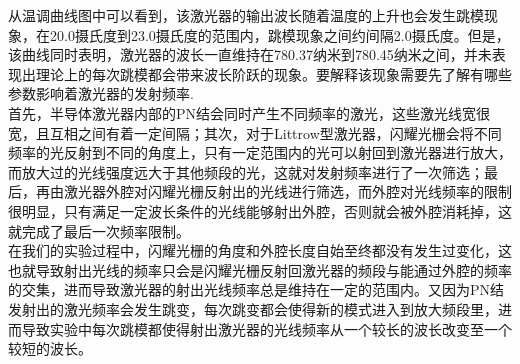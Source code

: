\documentclass{article}
\begin{document}
\begin{CJK}{UTF8}{gkai}
\indent 从温调曲线图中可以看到，该激光器的输出波长随着温度的上升也会发生跳模现象，在20.0摄氏度到23.0摄氏度的范围内，跳模现象之间约间隔2.0摄氏度。但是，该曲线同时表明，激光器的波长一直维持在780.37纳米到780.45纳米之间，并未表现出理论上的每次跳模都会带来波长阶跃的现象。要解释该现象需要先了解有哪些参数影响着激光器的发射频率.\\
\indent 首先，半导体激光器内部的PN结会同时产生不同频率的激光，这些激光线宽很宽，且互相之间有着一定间隔；其次，对于Littrow型激光器，闪耀光栅会将不同频率的光反射到不同的角度上，只有一定范围内的光可以射回到激光器进行放大，而放大过的光线强度远大于其他频段的光，这就对发射频率进行了一次筛选；最后，再由激光器外腔对闪耀光栅反射出的光线进行筛选，而外腔对光线频率的限制很明显，只有满足一定波长条件的光线能够射出外腔，否则就会被外腔消耗掉，这就完成了最后一次频率限制。\\
\indent 在我们的实验过程中，闪耀光栅的角度和外腔长度自始至终都没有发生过变化，这也就导致射出光线的频率只会是闪耀光栅反射回激光器的频段与能通过外腔的频率的交集，进而导致激光器的射出光线频率总是维持在一定的范围内。又因为PN结发射出的激光频率会发生跳变，每次跳变都会使得新的模式进入到放大频段里，进而导致实验中每次跳模都使得射出激光器的光线频率从一个较长的波长改变至一个较短的波长。



\end{CJK}
\end{document}
